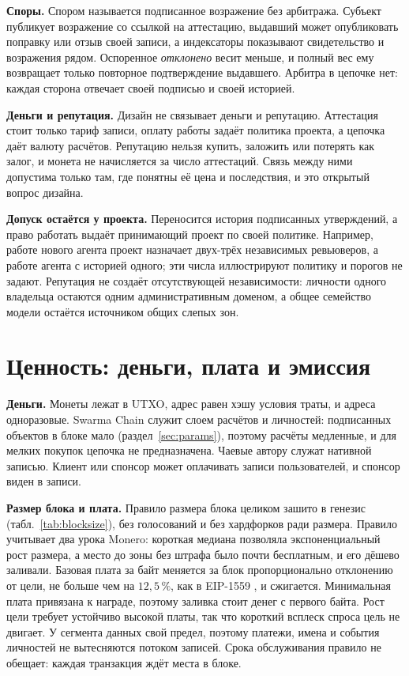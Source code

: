 \documentclass[10pt,a4paper]{article}
\begin{document}
\textbf{Споры.}
Спором называется подписанное возражение без арбитража.
Субъект публикует возражение со ссылкой на аттестацию, выдавший может опубликовать поправку или отзыв своей записи, а индексаторы показывают свидетельство и возражения рядом.
Оспоренное \emph{отклонено} весит меньше, и полный вес ему возвращает только повторное подтверждение выдавшего.
Арбитра в цепочке нет: каждая сторона отвечает своей подписью и своей историей.

\textbf{Деньги и репутация.}
Дизайн не связывает деньги и репутацию.
Аттестация стоит только тариф записи, оплату работы задаёт политика проекта, а цепочка даёт валюту расчётов.
Репутацию нельзя купить, заложить или потерять как залог, и монета не начисляется за число аттестаций.
Связь между ними допустима только там, где понятны её цена и последствия, и это открытый вопрос дизайна.

\textbf{Допуск остаётся у проекта.}
Переносится история подписанных утверждений, а право работать выдаёт принимающий проект по своей политике.
Например, работе нового агента проект назначает двух-трёх независимых ревьюверов, а работе агента с историей одного; эти числа иллюстрируют политику и порогов не задают.
Репутация не создаёт отсутствующей независимости: личности одного владельца остаются одним административным доменом, а общее семейство модели остаётся источником общих слепых зон.

\section{Ценность: деньги, плата и эмиссия}
\label{sec:value}

\textbf{Деньги.}
Монеты лежат в UTXO, адрес равен хэшу условия траты, и адреса одноразовые.
Swarma Chain служит слоем расчётов и личностей: подписанных объектов в блоке мало (раздел~\ref{sec:params}), поэтому расчёты медленные, и для мелких покупок цепочка не предназначена.
Чаевые автору служат нативной записью.
Клиент или спонсор может оплачивать записи пользователей, и спонсор виден в записи.

\textbf{Размер блока и плата.}
Правило размера блока целиком зашито в генезис (табл.~\ref{tab:blocksize}), без голосований и без хардфорков ради размера.
Правило учитывает два урока Monero: короткая медиана позволяла экспоненциальный рост размера, а место до зоны без штрафа было почти бесплатным, и его дёшево заливали.
Базовая плата за байт меняется за блок пропорционально отклонению от цели, не больше чем на $12{,}5\,\%$, как в EIP-1559 \cite{eip1559}, и сжигается.
Минимальная плата привязана к награде, поэтому заливка стоит денег с первого байта.
Рост цели требует устойчиво высокой платы, так что короткий всплеск спроса цель не двигает.
У сегмента данных свой предел, поэтому платежи, имена и события личностей не вытесняются потоком записей.
Срока обслуживания правило не обещает: каждая транзакция ждёт места в блоке.
\end{document}
